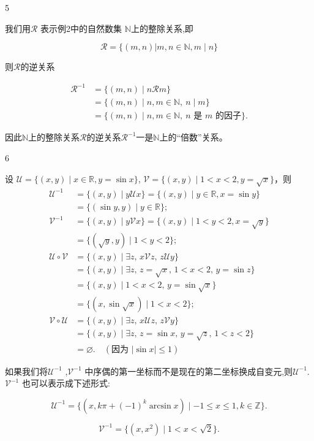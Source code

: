 \begin{sourceexample}{5}

我们用\(\mathscr{R}\) 表示例2中的自然数集 $\mathbb{N}$上的整除关系,即

\[
\mathscr{R} = \{(m, n) | m, n \in \mathbb{N}, m \mid n\}
\] 

则\(\mathscr{R}\)的逆关系

\begin{align*}
	\mathscr{R}^{-1} 
	&= \{(m, n) \mid n \mathscr{R} m\} \\
	&= \{(m, n) \mid n, m \in \mathbb{N},\ n \mid m\} \\
	&= \{(m, n) \mid n, m \in \mathbb{N},\ n \text{ 是 } m \text{ 的因子}\}.
\end{align*}

因此$\mathbb{N}$上的整除关系$\mathscr{R}$的逆关系$\mathscr{R}^{-1}$一是$\mathbb{N}$上的“倍数”关系。


\end{sourceexample}


\begin{sourceexample}{6}

设 \(\mathscr{U} = \{(x, y) \mid x \in \mathbb{R}, y = \sin x\}\), 
\(\mathscr{V} = \{(x, y) \mid 1 < x < 2, y = \sqrt{x}\}\)，则
\begin{align*}
	\mathscr{U}^{-1} &= \{(x, y) \mid y \mathscr{U} x\} = \{(x, y) \mid y \in \mathbb{R}, x = \sin y\} \\
	&= \{(\sin y, y) \mid y \in \mathbb{R}\}; \\
	\mathscr{V}^{-1} &= \{(x, y) \mid y \mathscr{V} x\} = \{(x, y) \mid 1 < y < 2, x = \sqrt{y}\} \\
	&= \{(\sqrt{y}, y) \mid 1 < y < 2\}; \\
	\mathscr{U} \circ \mathscr{V} &= \{(x, y) \mid \exists z,\, x \mathscr{V} z,\, z \mathscr{U} y\} \\
	&= \{(x, y) \mid \exists z,\, z = \sqrt{x},\, 1 < x < 2,\, y = \sin z\} \\
	&= \{(x, y) \mid 1 < x < 2,\, y = \sin \sqrt{x}\} \\
	&= \{(x, \sin \sqrt{x}) \mid 1 < x < 2\}; \\
	\mathscr{V} \circ \mathscr{U} &= \{(x, y) \mid \exists z,\, x \mathscr{U} z,\, z \mathscr{V} y\} \\
	&= \{(x, y) \mid \exists z,\, z = \sin x,\, y = \sqrt{z},\, 1 < z < 2\} \\
	&= \varnothing. \quad (\text{因为 } |\sin x| \leq 1)
\end{align*}

如果我们将\(\mathscr{U}^{-1}\) ,\(\mathscr{V}^{-1}\) 中序偶的第一坐标而不是现在的第二坐标换成自变元,则\(\mathscr{U}^{-1}\).\(\mathscr{V}^{-1}\) 也可以表示成下述形式:

\[\mathscr{U}^{-1} = \{(x, k\pi + (-1)^k \arcsin x) \mid -1 \le x \le 1, k \in \mathbb{Z}\}.\]

\[\mathscr{V}^{-1} = \{(x, x^2) \mid 1 < x < \sqrt{2}\}.\]


\end{sourceexample}


